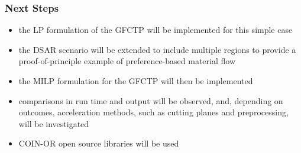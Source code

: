 \begin{frame}[ctb!]
  \frametitle{Next Steps} 

  \begin{itemize}
    \item the LP formulation of the GFCTP will be implemented for this simple
      case
    \item the DSAR scenario will be extended to include multiple regions to
      provide a proof-of-principle example of preference-based material flow
    \item the MILP formulation for the GFCTP will then be implemented
    \item comparisons in run time and output will be observed, and, depending on
      outcomes, acceleration methods, such as cutting planes and preprocessing,
      will be investigated
    \item COIN-OR\cite{lougee_common_2003} open source libraries will be used
  \end{itemize}
\end{frame}
